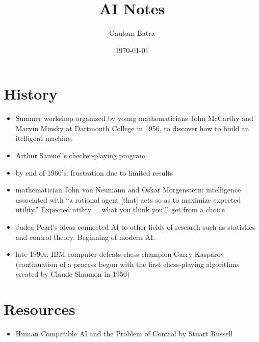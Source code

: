 \documentclass[11pt,twoside,a4paper,titlepage]{article}
\begin{document}
\title{AI Notes}
\author{Gautam Batra}
\date{\today}
\maketitle

\section{History}
\begin{itemize}
    \item Summer workshop organized by young mathematicians John McCarthy and Marvin Minsky at Dartmouth College in 1956, to discover how to build an itelligent machine.
    \item Arthur Samuel’s checker-playing program
    \item by end of 1960's: frustration due to limited results
    \item  mathematician John von Neumann and Oskar Morgenstern: intelligence associated with ``a rational agent [that] acts so as to maximize expected utility.'' Expected utility = what you think you`ll get from a choice
    \item Judea Pearl’s ideas connected AI to other fields of research such as statistics and control theory. Beginning of modern AI.
    \item late 1990s: IBM computer defeats chess champion Garry Kasparov (continuation of a process begun with the first chess-playing algorithms created by Claude Shannon in 1950)
\end{itemize}
\section{Resources}
\begin{itemize}
    \item Human Compatible AI and the Problem of Control by Stuart Russell
\end{itemize}
\end{document}
